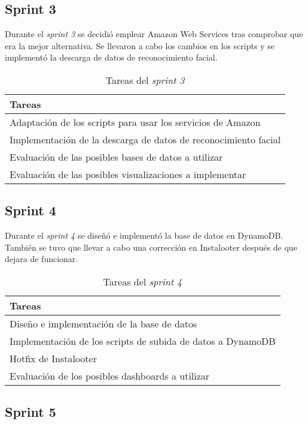 \subsection{Sprint 3}
Durante el \textit{sprint 3} se decidió emplear Amazon Web Services tras comprobar que era la mejor alternativa. Se llevaron a cabo los cambios en los scripts y se implementó la descarga de datos de reconocimiento facial.

\begin{table}[H]
    \centering
    \begin{tabular}{l}
    \hline
    \textbf{Tareas} \\ \hline
    Adaptación de los scripts para usar los servicios de Amazon \\
    Implementación de la descarga de datos de reconocimiento facial \\
    Evaluación de las posibles bases de datos a utilizar \\
    Evaluación de las posibles visualizaciones a implementar \\ \hline
    \end{tabular}
    \caption{Tareas del \textit{sprint 3}}
    \label{tab:tasks_sprint3}
\end{table}

\subsection{Sprint 4}

Durante el \textit{sprint 4} se diseñó e implementó la base de datos en DynamoDB. También se tuvo que llevar a cabo una corrección en Instalooter después de que dejara de funcionar.

\begin{table}[H]
    \centering
    \begin{tabular}{l}
    \hline
    \textbf{Tareas} \\ \hline
    Diseño e implementación de la base de datos \\
    Implementación de los scripts de subida de datos a DynamoDB \\
    Hotfix de Instalooter \\
    Evaluación de los posibles dashboards a utilizar \\ \hline
    \end{tabular}
    \caption{Tareas del \textit{sprint 4}}
    \label{tab:tasks_sprint4}
\end{table}

\subsection{Sprint 5}

